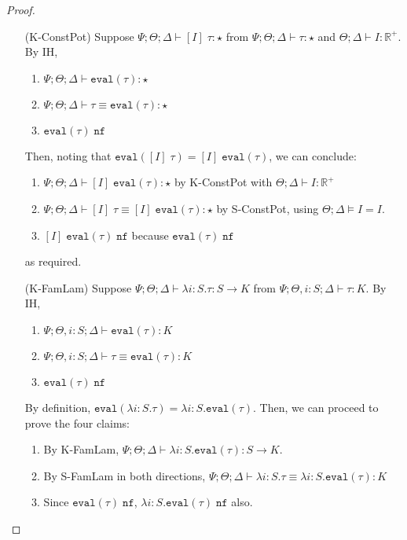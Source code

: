 \begin{proof}
\begin{enumerate}
  \item[(K-ConstPot)] Suppose ${\Psi ; \Theta ; \Delta \vdash [I] \; \tau : \star}$ from $\Psi ; \Theta ; \Delta \vdash \tau : \star$ and $\Theta ; \Delta \vdash I : \mathbb{R}^+$. By IH,
  \begin{enumerate}[1.]
    \item $\Psi ; \Theta ; \Delta \vdash \texttt{eval}(\tau) : \star$
    \item $\Psi ; \Theta ; \Delta \vdash \tau \equiv \texttt{eval}(\tau) : \star$
    \item $\texttt{eval}(\tau) \; \texttt{nf}$
  \end{enumerate}
  Then, noting that $\texttt{eval}([I] \; \tau) = [I] \; \texttt{eval}(\tau)$, we can conclude:
  \begin{enumerate}
   \item $\Psi ; \Theta ; \Delta \vdash [I] \; \texttt{eval}(\tau) : \star$ by K-ConstPot with $\Theta ; \Delta \vdash I : \mathbb{R}^+$
   \item $\Psi ; \Theta ; \Delta \vdash [I] \; \tau \equiv [I] \; \texttt{eval}(\tau) : \star$ by S-ConstPot, using $\Theta ; \Delta \vDash I = I$.
   \item $[I] \; \texttt{eval}(\tau) \; \texttt{nf}$ because $\texttt{eval}(\tau) \; \texttt{nf}$
  \end{enumerate}
  as required.
  
  \item[(K-FamLam)] Suppose ${\Psi ; \Theta ; \Delta \vdash \lambda i : S. \tau : S \to K}$ from ${\Psi ; \Theta, i : S ; \Delta \vdash \tau : K}$. By IH,
  \begin{enumerate}[1.]
   \item $\Psi ; \Theta, i : S ; \Delta \vdash \texttt{eval}(\tau) : K$
   \item $\Psi ; \Theta, i : S ; \Delta\vdash \tau \equiv \texttt{eval}(\tau) : K$
   \item $\texttt{eval}(\tau) \; \texttt{nf}$
\end{enumerate}
  By definition, $\texttt{eval}(\lambda i : S. \tau) = \lambda i : S. \texttt{eval}(\tau)$. Then, we can proceed to prove the four claims:
  \begin{enumerate}[1.]
    \item By K-FamLam, $\Psi ; \Theta ; \Delta \vdash \lambda i : S. \texttt{eval}(\tau) : S \to K$.
    \item By S-FamLam in both directions, $\Psi ; \Theta ; \Delta\vdash \lambda i : S. \tau \equiv \lambda i : S. \texttt{eval}(\tau) : K$
    \item Since $\texttt{eval}(\tau) \; \texttt{nf}$, $\lambda i : S. \texttt{eval}(\tau) \; \texttt{nf}$ also.
  \end{enumerate}
  

\end{enumerate}
\end{proof}
